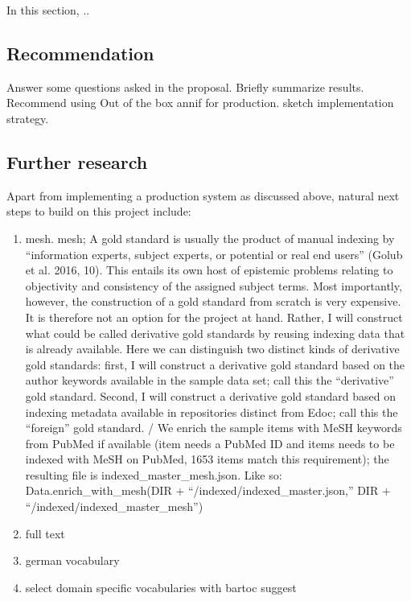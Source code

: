 In this section, ..

\hypertarget{recommendation}{%
\subsection{Recommendation}\label{recommendation}}

Answer some questions asked in the proposal. Briefly summarize results.
Recommend using Out of the box annif for production. sketch
implementation strategy.

\hypertarget{further-research}{%
\subsection{Further research}\label{further-research}}

Apart from implementing a production system as discussed above, natural
next steps to build on this project include:

\begin{enumerate}
\def\labelenumi{\arabic{enumi}.}
\item
  mesh. mesh; A gold standard is usually the product of manual indexing
  by ``information experts, subject experts, or potential or real end
  users'' (Golub et al. 2016, 10). This entails its own host of
  epistemic problems relating to objectivity and consistency of the
  assigned subject terms. Most importantly, however, the construction of
  a gold standard from scratch is very expensive. It is therefore not an
  option for the project at hand. Rather, I will construct what could be
  called derivative gold standards by reusing indexing data that is
  already available. Here we can distinguish two distinct kinds of
  derivative gold standards: first, I will construct a derivative gold
  standard based on the author keywords available in the sample data
  set; call this the ``derivative'' gold standard. Second, I will
  construct a derivative gold standard based on indexing metadata
  available in repositories distinct from Edoc; call this the
  ``foreign'' gold standard. / We enrich the sample items with MeSH
  keywords from PubMed if available (item needs a PubMed ID and items
  needs to be indexed with MeSH on PubMed, 1653 items match this
  requirement); the resulting file is indexed\_master\_mesh.json. Like
  so: Data.enrich\_with\_mesh(DIR + ``/indexed/indexed\_master.json,''
  DIR + ``/indexed/indexed\_master\_mesh'')
\item
  full text
\item
  german vocabulary
\item
  select domain specific vocabularies with bartoc suggest
\end{enumerate}

